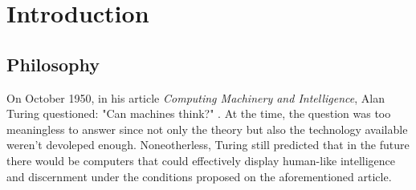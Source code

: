 \documentclass[12pt]{article}
\begin{document}


\section{Introduction}
\subsection{Philosophy}
On October 1950, in his article \textit{Computing Machinery and Intelligence}, Alan Turing questioned: "Can machines think?" \autocite{turingCOMPUTINGMACHINERYINTELLIGENCE1950}. At the time, the question was too meaningless to answer since not only the theory but also the technology available weren't devoleped enough. Noneotherless, Turing still predicted that in the future there would be computers that could effectively display human-like intelligence and discernment under the conditions proposed on the aforementioned article.

\end{document}
